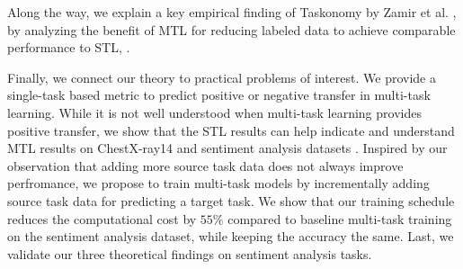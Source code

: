 Along the way, we explain a key empirical finding of Taskonomy by Zamir et al. \cite{ZSSGM18}, by analyzing the benefit of MTL for reducing labeled data to achieve comparable performance to STL, .

Finally, we connect our theory to practical problems of interest.
We provide a single-task based metric to predict positive or negative transfer in multi-task learning.
While it is not well understood when multi-task learning provides positive transfer, we show that the STL results can help indicate and understand MTL results on ChestX-ray14 \cite{chexnet17} and sentiment analysis datasets \cite{LZWDA18}.
Inspired by our observation that adding more source task data does not always improve perfromance, we propose to train multi-task models by incrementally adding source task data for predicting a target task.
We show that our training schedule reduces the computational cost by $55\%$ compared to baseline multi-task training on the sentiment analysis dataset, while keeping the accuracy the same.
Last, we validate our three theoretical findings on sentiment analysis tasks.
